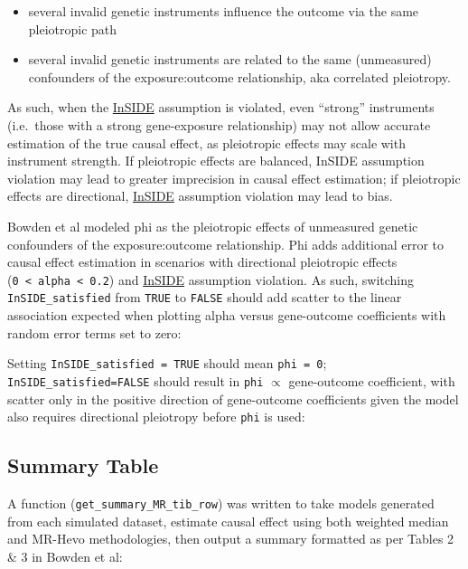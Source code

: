 \documentclass[
]{article}
\begin{document}
\begin{itemize}
\item
  several invalid genetic instruments influence the outcome via the same pleiotropic path
\item
  several invalid genetic instruments are related to the same (unmeasured) confounders of the exposure:outcome relationship, aka correlated pleiotropy.
\end{itemize}

As such, when the \hyperref[acronyms_InSIDE]{InSIDE} assumption is violated, even ``strong'' instruments (i.e.~those with a strong gene-exposure relationship) may not allow accurate estimation of the true causal effect, as pleiotropic effects may scale with instrument strength. If pleiotropic effects are balanced, InSIDE assumption violation may lead to greater imprecision in causal effect estimation; if pleiotropic effects are directional, \hyperref[acronyms_InSIDE]{InSIDE} assumption violation may lead to bias.

Bowden et al\textsuperscript{} modeled phi as the pleiotropic effects of unmeasured genetic confounders of the exposure:outcome relationship. Phi adds additional error to causal effect estimation in scenarios with directional pleiotropic effects (\texttt{0\ \textless{}\ alpha\ \textless{}\ 0.2}) and \hyperref[acronyms_InSIDE]{InSIDE} assumption violation. As such, switching \texttt{InSIDE\_satisfied} from \texttt{TRUE} to \texttt{FALSE} should add scatter to the linear association expected when plotting alpha versus gene-outcome coefficients with random error terms set to zero:

\newpage

Setting \texttt{InSIDE\_satisfied\ =\ TRUE} should mean \texttt{phi\ =\ 0}; \texttt{InSIDE\_satisfied=FALSE} should result in \texttt{phi} \(\propto\) gene-outcome coefficient, with scatter only in the positive direction of gene-outcome coefficients given the model also requires directional pleiotropy before \texttt{phi} is used:

\newpage

\subsection{Summary Table}\label{appendix-sim-summ}

A function (\texttt{get\_summary\_MR\_tib\_row}) was written to take models generated from each simulated dataset, estimate causal effect using both weighted median and MR-Hevo methodologies, then output a summary formatted as per Tables 2 \& 3 in Bowden et al\textsuperscript{}:
\end{document}
